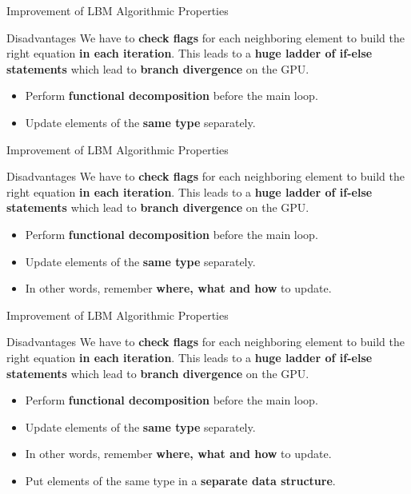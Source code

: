 \documentclass[9pt]{beamer}
\begin{document}
\begin{frame}[t]{Improvement of LBM Algorithmic Properties}
\begin{block}{Disadvantages}
We have to \textbf{check flags} for each neighboring element to build the right equation \textbf{in each iteration}. This leads to a \textbf{huge ladder of if-else statements} which lead to \textbf{branch divergence} on the GPU.
\end{block}
\begin{itemize}
\item Perform \textbf{functional decomposition} before the main loop.
\item Update elements of the \textbf{same type} separately.
\end{itemize}
\end{frame}



\begin{frame}[t]{Improvement of LBM Algorithmic Properties}
\begin{block}{Disadvantages}
We have to \textbf{check flags} for each neighboring element to build the right equation \textbf{in each iteration}. This leads to a \textbf{huge ladder of if-else statements} which lead to \textbf{branch divergence} on the GPU.
\end{block}
\begin{itemize}
\item Perform \textbf{functional decomposition} before the main loop.
\item Update elements of the \textbf{same type} separately.
\item In other words, remember \textbf{where, what and how} to update.
\end{itemize}
\end{frame}



\begin{frame}[t]{Improvement of LBM Algorithmic Properties}
\begin{block}{Disadvantages}
We have to \textbf{check flags} for each neighboring element to build the right equation \textbf{in each iteration}. This leads to a \textbf{huge ladder of if-else statements} which lead to \textbf{branch divergence} on the GPU.
\end{block}
\begin{itemize}
\item Perform \textbf{functional decomposition} before the main loop.
\item Update elements of the \textbf{same type} separately.\
\item In other words, remember \textbf{where, what and how} to update.
\item Put elements of the same type in a \textbf{separate data structure}.
\end{itemize}
\end{frame}
\end{document}
